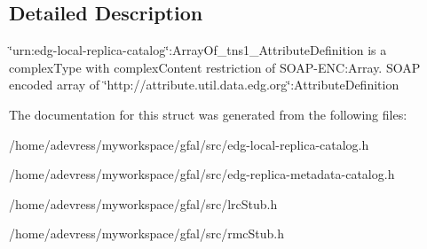 \subsection{Detailed Description}
\char`\"{}urn:edg-local-replica-catalog\char`\"{}:Array\-Of\_\-tns1\_\-Attribute\-Definition is a complex\-Type with complex\-Content restriction of SOAP-ENC:Array. SOAP encoded array of \char`\"{}http://attribute.util.data.edg.org\char`\"{}:Attribute\-Definition 



The documentation for this struct was generated from the following files:\begin{CompactItemize}
\item 
/home/adevress/myworkspace/gfal/src/edg-local-replica-catalog.h\item 
/home/adevress/myworkspace/gfal/src/edg-replica-metadata-catalog.h\item 
/home/adevress/myworkspace/gfal/src/lrc\-Stub.h\item 
/home/adevress/myworkspace/gfal/src/rmc\-Stub.h\end{CompactItemize}
